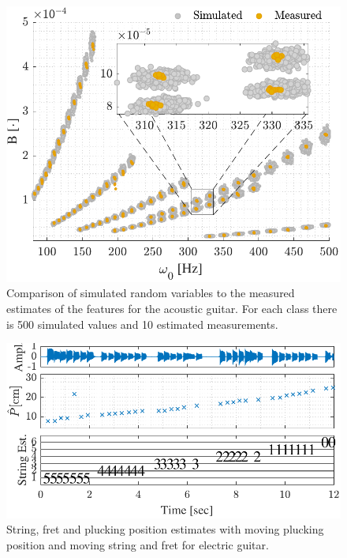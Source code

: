 %
%
%
\begin{figure}[t]
\centering
   \includegraphics[width=.96\linewidth]{img/w0_vs_B2.pdf}\vspace{-2mm}
   \caption{Comparison of simulated random variables to the measured estimates of the features for the acoustic guitar. For each class there is 500 simulated values and 10 estimated measurements.}
   \label{fig:string_and_fret_model} 
\end{figure}


\begin{figure}[t]
\centering
   \includegraphics[width=.86\linewidth]{img/tablature_constant_note25_LSD}\vspace{-2mm}
   \caption{String, fret and plucking position estimates with moving plucking position and moving string and fret for electric guitar.}
   \label{fig:pluck_position_fixed_tabs} 
\end{figure}